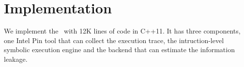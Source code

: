 \section{Implementation}
We implement the \tana\ with 12K lines of code in C++11. It has three components, one Intel
Pin tool that can collect the execution trace, the intruction-level symbolic execution
engine and the backend that can estimate the information leakage. 

